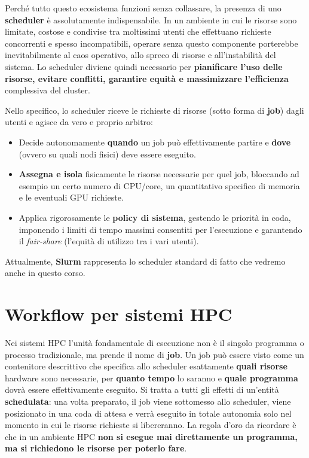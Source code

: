 Perché tutto questo ecosistema funzioni senza collassare, la presenza di uno \textbf{scheduler} è assolutamente indispensabile. In un ambiente in cui le risorse sono limitate, costose e condivise tra moltissimi utenti che effettuano richieste concorrenti e spesso incompatibili, operare senza questo componente porterebbe inevitabilmente al caos operativo, allo spreco di risorse e all'instabilità del sistema. Lo scheduler diviene quindi necessario per \textbf{pianificare l'uso delle risorse, evitare conflitti, garantire equità e massimizzare l'efficienza} complessiva del cluster.

Nello specifico, lo scheduler riceve le richieste di risorse (sotto forma di \textbf{job}) dagli utenti e agisce da vero e proprio arbitro:
\begin{itemize}
    \item Decide autonomamente \textbf{quando} un job può effettivamente partire e \textbf{dove} (ovvero su quali nodi fisici) deve essere eseguito.
    \item \textbf{Assegna e isola} fisicamente le risorse necessarie per quel job, bloccando ad esempio un certo numero di CPU/core, un quantitativo specifico di memoria e le eventuali GPU richieste.
    \item Applica rigorosamente le \textbf{policy di sistema}, gestendo le priorità in coda, imponendo i limiti di tempo massimi consentiti per l'esecuzione e garantendo il \textit{fair-share} (l'equità di utilizzo tra i vari utenti).
\end{itemize}

Attualmente, \textbf{Slurm} rappresenta lo scheduler standard di fatto che vedremo anche in questo corso.

\section{Workflow per sistemi HPC}
Nei sistemi HPC l'unità fondamentale di esecuzione non è il singolo programma o processo tradizionale, ma prende il nome di \textbf{job}. Un job può essere visto come un contenitore descrittivo che specifica allo scheduler esattamente \textbf{quali risorse} hardware sono necessarie, per \textbf{quanto tempo} lo saranno e \textbf{quale programma} dovrà essere effettivamente eseguito. Si tratta a tutti gli effetti di un'entità \textbf{schedulata}: una volta preparato, il job viene sottomesso allo scheduler, viene posizionato in una coda di attesa e verrà eseguito in totale autonomia solo nel momento in cui le risorse richieste si libereranno. La regola d'oro da ricordare è che in un ambiente HPC \textbf{non si esegue mai direttamente un programma, ma si richiedono le risorse per poterlo fare}.


